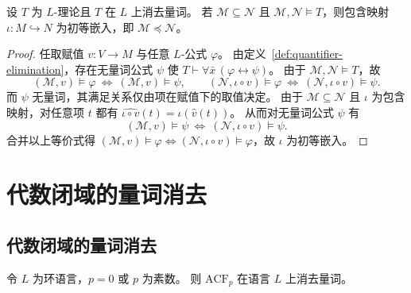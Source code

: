 \documentclass[lang=cn,a4paper,newtx,section]{elegantbook}
\begin{document}
\begin{proposition}
\label{qe-implies-elementary-substructure}
设 $T$ 为 $L$-理论且 $T$ 在 $L$ 上消去量词。
若 $\mathcal M\subseteq\mathcal N$ 且 $\mathcal M,\mathcal N\models T$，则包含映射 $\iota:M\hookrightarrow N$ 为初等嵌入，即 $\mathcal M\preccurlyeq\mathcal N$。
\end{proposition}

\begin{proof}
任取赋值 $v:V\to M$ 与任意 $L$-公式 $\varphi$。
由定义~\ref{def:quantifier-elimination}，存在无量词公式 $\psi$ 使 $T\vdash\forall\bar x\,(\varphi\leftrightarrow\psi)$。
由于 $\mathcal M,\mathcal N\models T$，故
\[
  (\mathcal M,v)\models\varphi\ \Longleftrightarrow\ (\mathcal M,v)\models\psi,
  \qquad
  (\mathcal N,\iota\circ v)\models\varphi\ \Longleftrightarrow\ (\mathcal N,\iota\circ v)\models\psi.
\]
而 $\psi$ 无量词，其满足关系仅由项在赋值下的取值决定。
由于 $\mathcal M\subseteq\mathcal N$ 且 $\iota$ 为包含映射，对任意项 $t$ 都有 $\widehat{\iota\circ v}(t)=\iota(\hat v(t))$。
从而对无量词公式 $\psi$ 有
\[
  (\mathcal M,v)\models\psi\ \Longleftrightarrow\ (\mathcal N,\iota\circ v)\models\psi.
 \]
 合并以上等价式得 $(\mathcal M,v)\models\varphi\Longleftrightarrow(\mathcal N,\iota\circ v)\models\varphi$，故 $\iota$ 为初等嵌入。
 \end{proof}

\chapter{代数闭域的量词消去}

\section{代数闭域的量词消去}

\begin{theorem}
\label{acf_p_quantifier_elimination}
令 $L$ 为环语言，$p=0$ 或 $p$ 为素数。
则 $\mathrm{ACF}_p$ 在语言 $L$ 上消去量词。
\end{theorem}
\end{document}
